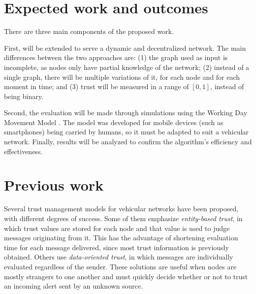 \documentclass[12pt]{article}
\begin{document}
\section{Expected work and outcomes}
There are three main components of the proposed work.

First, \cite{vernize2015malicious} will be extended to serve a dynamic and decentralized network.
The main differences between the two approaches are:
(1) the graph used as input is incomplete, as nodes only have partial knowledge of the network;
(2) instead of a single graph, there will be multiple variations of it, for each node and for each moment in time;
and (3) trust will be measured in a range of $[0,1]$, instead of being binary. 

Second, the evaluation will be made through simulations using the Working Day Movement Model \cite{ekman2008working}.
The model was developed for mobile devices (such as smartphones) being carried by humans, so it must be adapted to suit a vehicular network.
Finally, results will be analyzed to confirm the algorithm's efficiency and effectiveness.

\section{Previous work}

Several trust management models for vehicular networks have been proposed, with different degrees of success.
Some of them emphasize \textit{entity-based trust}, in which trust values are stored for each node and that value is used to judge messages originating from it.
This has the advantage of shortening evaluation time for each message delivered, since most trust information is previously obtained.
Others use \textit{data-oriented trust}, in which messages are individually evaluated regardless of the sender.
These solutions are useful when nodes are mostly strangers to one another and must quickly decide whether or not to trust an incoming alert sent by an unknown source.
\end{document}
